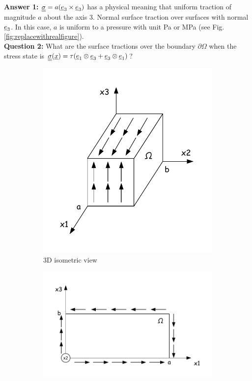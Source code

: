 \documentclass[letter,12pt]{article}
\begin{document}
\noindent \textbf{Answer 1:} $\underline{\underline{\sigma}} = a (\underline{e}_3 \times \underline{e}_3)$ has a physical meaning that uniform traction of magnitude $a$ about the axis $3$. Normal surface traction over surfaces with normal $\underline{e}_3$. In this case, $a$ is uniform to a pressure with unit Pa or MPa (see Fig. \ref{fig:replacewithrealfigure}).\\



\newpage
\noindent \textbf{Question 2:} What are the surface tractions over the boundary $\partial \Omega$ when the stress state is $\underline{\underline{\sigma}} (\underline{x}) = \tau (\underline{e}_1 \otimes \underline{e}_3 + \underline{e}_3 \otimes \underline{e}_1 )$? \\

\begin{figure}[ht]
	\centering
	\begin{subfigure}{.4\textwidth}
		\centering
		\includegraphics[width=1\linewidth]{figures/shear133d}
		\caption{3D isometric view}
	\end{subfigure}
	\hspace{10mm}
	\begin{subfigure}{.45\textwidth}
		\centering
		\includegraphics[width=1\linewidth]{figures/shear13}

\end{subfigure}
\end{figure}
\end{document}
